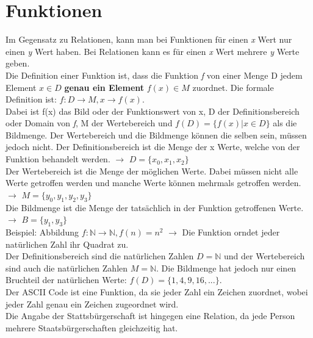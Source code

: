 \documentclass{article}
\newcommand{\N}{\mathbb{N}}
\begin{document}
	 \section{Funktionen}
	 Im Gegensatz zu Relationen, kann man bei Funktionen für einen \textit{x} Wert nur einen \textit{y} Wert haben. Bei Relationen kann es für einen \textit{x} Wert mehrere \textit{y} Werte geben. \\
	 Die Definition einer Funktion ist, dass die Funktion \textit{f} von einer Menge D jedem Element $x\in D$ \textbf{genau ein Element} $f(x)\in M$ zuordnet. Die formale Definition ist: $f:D \rightarrow M, x \rightarrow f(x)$. \\
	 Dabei ist f(x) das Bild oder der Funktionswert von x, D der Definitionsbereich oder Domain von \textit{f}, M der Wertebereich und $f(D)=\{f(x)|x\in D\}$ als die Bildmenge. Der Wertebereich und die Bildmenge können die selben sein, müssen jedoch nicht.
	 Der Definitionsbereich ist die Menge der x Werte, welche von der Funktion behandelt werden. $\to$ $D=\{x_0, x_1, x_2\}$ \\
	 Der Wertebereich ist die Menge der möglichen Werte. Dabei müssen nicht alle Werte getroffen werden und manche Werte können mehrmals getroffen werden. $\to$ $M=\{y_0,y_1,y_2,y_3\}$ \\
	 Die Bildmenge ist die Menge der tatsächlich in der Funktion getroffenen Werte. $\to$ $B=\{y_1, y_3\}$ \\
	 Beispiel: Abbildung $f:\N \rightarrow \N, f(n)=n^2$ $\to$ Die Funktion orndet jeder natürlichen Zahl ihr Quadrat zu. \\
	 Der Definitionsbereich sind die natürlichen Zahlen $D=\N$ und der Wertebereich sind auch die natürlichen Zahlen $M=\N$. Die Bildmenge hat jedoch nur einen Bruchteil der natürlichen Werte: $f(D)=\{1,4,9,16,...\}$. \\
	 Der ASCII Code ist eine Funktion, da sie jeder Zahl ein Zeichen zuordnet, wobei jeder Zahl genau ein Zeichen zugeordnet wird. \\
	 Die Angabe der Stattsbürgerschaft ist hingegen eine Relation, da jede Person mehrere Staatsbürgerschaften gleichzeitig hat.
\end{document}
